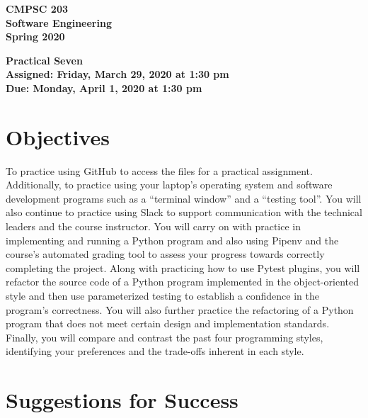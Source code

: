 \documentclass[11pt]{article}
\newcommand{\assignmentduedate}{April 1}
\newcommand{\assignmentassignedate}{March 29}
\newcommand{\assignmentnumber}{Seven}
\newcommand{\labyear}{2020}
\newcommand{\labdueday}{Monday}
\newcommand{\labassignday}{Friday}
\newcommand{\labtime}{1:30 pm}
\newcommand{\assigneddate}{Assigned: \labassignday, \assignmentassignedate, \labyear{} at \labtime{}}
\newcommand{\duedate}{Due: \labdueday, \assignmentduedate, \labyear{} at \labtime{}}
\newcommand{\labtitle}[1]
{
  \begin{center}
    \begin{center}
      \bf
      CMPSC 203\\Software Engineering\\
      Spring 2020\\
      \medskip
    \end{center}
    \bf
    #1
  \end{center}
}
\begin{document}
\thispagestyle{empty}

\labtitle{Practical \assignmentnumber{} \\ \assigneddate{} \\ \duedate{}}

\section*{Objectives}

To practice using GitHub to access the files for a practical assignment.
Additionally, to practice using your laptop's operating system and software
development programs such as a ``terminal window'' and a ``testing tool''. You
will also continue to practice using Slack to support communication with the
technical leaders and the course instructor. You will carry on with practice
in implementing and running a Python program and also using Pipenv and the
course's automated grading tool to assess your progress towards correctly
completing the project. Along with practicing how to use Pytest plugins, you
will refactor the source code of a Python program implemented in the
object-oriented style and then use parameterized testing to establish a
confidence in the program's correctness. You will also further practice the
refactoring of a Python program that does not meet certain design and
implementation standards. Finally, you will compare and contrast the past four
programming styles, identifying your preferences and the trade-offs inherent in
each style.

\section*{Suggestions for Success}
\end{document}
